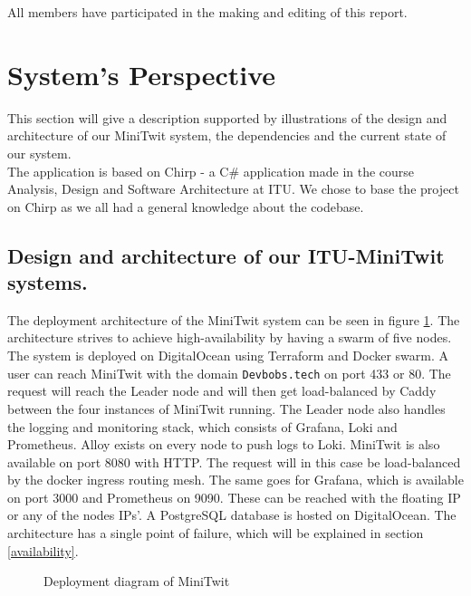 All members have participated in the making and editing of this report.

\section{System's Perspective}\label{systems-perspective}

This section will give a description supported by illustrations of the design and
architecture of our MiniTwit system, the dependencies and the current state
of our system. \\

The application is based on Chirp - a C\# application made in the course Analysis, Design and Software Architecture at ITU. 
We chose to base the project on Chirp as we all had a general knowledge about the codebase.

\subsection{Design and architecture of our ITU-MiniTwit
systems.}\label{design-and-architecture-of-our-itu-minitwit-systems.}
 
The deployment architecture of the MiniTwit system can be seen in figure \ref{deployment-diagram}.
The architecture strives to achieve high-availability by having a swarm of five nodes.
The system is deployed on DigitalOcean using Terraform and Docker swarm.
A user can reach MiniTwit with the domain \texttt{Devbobs.tech} on port 433 or 80.
The request will reach the Leader node and will then get load-balanced by Caddy between the four instances of MiniTwit running.
The Leader node also handles the logging and monitoring stack, which consists of Grafana, Loki and Prometheus. Alloy exists on every node to push logs to Loki.
MiniTwit is also available on port 8080 with HTTP. The request will in this case be load-balanced by the docker ingress routing mesh. 
The same goes for Grafana, which is available on port 3000 and Prometheus on 9090. These can be reached with the floating IP or any of the nodes IPs'.
A PostgreSQL database is hosted on DigitalOcean.
The architecture has a single point of failure, which will be explained in section \ref{availability}. \\

\begin{figure} [H]
    \caption{Deployment diagram of MiniTwit}
    \label{deployment-diagram}
\end{figure}

